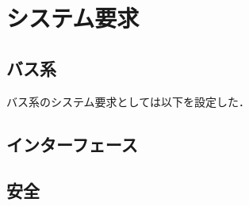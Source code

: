 \section{システム要求}





\subsection{バス系}
バス系のシステム要求としては以下を設定した．

\subsection{インターフェース}

\subsection{安全}
